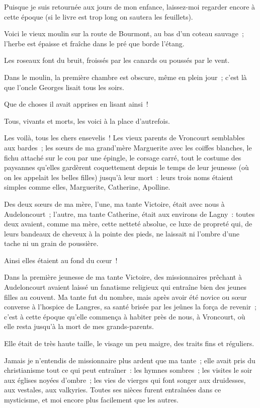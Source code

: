 \documentclass[french,twoside]{book} %
\begin{document}
Puisque je suis retournée aux jours de mon enfance, laissez-moi regarder encore à cette époque (si le livre est trop long on sautera les feuillets).\par
Voici le vieux moulin sur la route de Bourmont, au bas d’un coteau sauvage ; l’herbe est épaisse et fraîche dans le pré que borde l’étang.\par
Les roseaux font du bruit, froissés par les canards ou poussés par le vent.\par
Dans le moulin, la première chambre est obscure, même en plein jour ; c’est là que l’oncle Georges lisait tous les soirs.\par
Que de choses il avait apprises en lisant ainsi !\par
Tous, vivants et morts, les voici à la place d’autrefois.\par
Les voilà, tous les chers ensevelis ! Les vieux parents de Vroncourt semblables aux bardes ; les sœurs de ma grand’mère Marguerite avec les coiffes blanches, le fichu attaché sur le cou par une épingle, le corsage carré, tout le costume des paysannes qu’elles gardèrent coquettement depuis le temps de leur jeunesse (où on les appelait les belles filles) jusqu’à leur mort : leurs trois noms étaient simples comme elles, Marguerite, Catherine, Apolline.\par
 Des deux sœurs de ma mère, l’une, ma tante Victoire, était avec nous à Audeloncourt ; l’autre, ma tante Catherine, était aux environs de Lagny : toutes deux avaient, comme ma mère, cette netteté absolue, ce luxe de propreté qui, de leurs bandeaux de cheveux à la pointe des pieds, ne laissait ni l’ombre d’une tache ni un grain de poussière.\par
Ainsi elles étaient au fond du cœur !\par
Dans la première jeunesse de ma tante Victoire, des missionnaires prêchant à Audeloncourt avaient laissé un fanatisme religieux qui entraîne bien des jeunes filles au couvent. Ma tante fut du nombre, mais après avoir été novice ou sœur converse à l’hospice de Langres, sa santé brisée par les jeûnes la força de revenir ; c’est à cette époque qu’elle commença à habiter près de nous, à Vroncourt, où elle resta jusqu’à la mort de mes grands-parents.\par
Elle était de très haute taille, le visage un peu maigre, des traits fins et réguliers.\par
Jamais je n’entendis de missionnaire plus ardent que ma tante ; elle avait pris du christianisme tout ce qui peut entraîner : les hymnes sombres ; les visites le soir aux églises noyées d’ombre ; les vies de vierges qui font songer aux druidesses, aux vestales, aux valkyries. Toutes  ses nièces furent entraînées dans ce mysticisme, et moi encore plus facilement que les autres.\par
\end{document}
